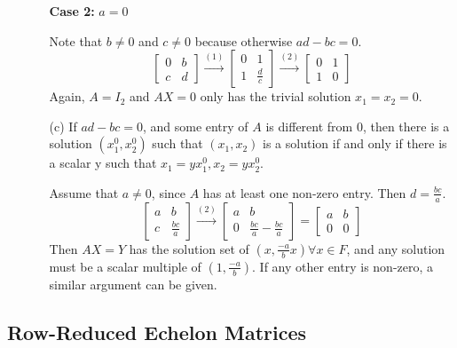 \documentclass{article}
\begin{document}
\begin{enumerate}[listparindent=\parindent]
\begin{enumerate}[listparindent=\parindent]
\textbf{Case 2:} \(a = 0\)

Note that \(b \neq 0\) and \(c \neq 0\) because otherwise \(ad - bc = 0\).
\[
    \begin{bmatrix}
        0 & b \\
        c & d
    \end{bmatrix}
    \xrightarrow{(1)}
    \begin{bmatrix}
        0 & 1 \\
        1 & \frac{d}{c}
    \end{bmatrix}
    \xrightarrow{(2)}
    \begin{bmatrix}
        0 & 1 \\
        1 & 0
    \end{bmatrix}
\]
Again, \(A = I_2\) and \(AX = 0\) only has the trivial solution \(x_1 = x_2 = 0\).

\item[(c)] If \(ad - bc = 0\), and some entry of \(A\) is different from 0, then there is a solution
    \( (x_1^0, x_2^0) \) such that \( (x_1, x_2) \) is a solution if and only if there is a scalar y such that
    \( x_1 = yx_1^0, x_2 = yx_2^0 \).

Assume that \(a \neq 0\), since \(A\) has at least one non-zero entry. Then \(d = \frac{bc}{a}\).
\[
    \begin{bmatrix}
        a & b \\
        c & \frac{bc}{a}
    \end{bmatrix}
    \xrightarrow{(2)}
    \begin{bmatrix}
        a & b \\
        0 & \frac{bc}{a} - \frac{bc}{a}
    \end{bmatrix}
    =
    \begin{bmatrix}
        a & b \\
        0 & 0
    \end{bmatrix}
\]
Then \(AX = Y\) has the solution set of \( (x, \frac{-a}{b}x) \forall x \in F \),
and any solution must be a scalar multiple of \( (1, \frac{-a}{b}) \).
If any other entry is non-zero, a similar argument can be given.
\end{enumerate}
\end{enumerate}

\subsection{Row-Reduced Echelon Matrices}
\end{document}
